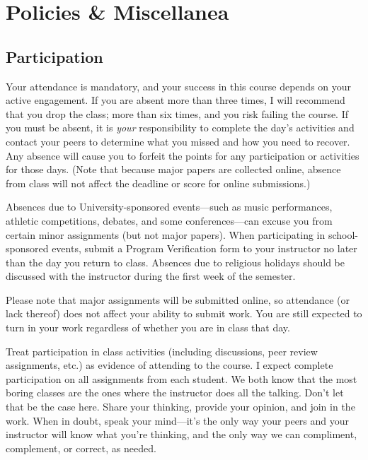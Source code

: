 \documentclass[11pt, twosides]{amsart}	%
\begin{document}
  

\section{Policies \& Miscellanea}

\subsection{Participation}
Your attendance is mandatory, and your success in this course depends on your active engagement.  If you are absent more than three times, I will recommend that you drop the class; more than six times, and you risk failing the course.  If you must be absent, it is \emph{your} responsibility to complete the day’s activities and contact your peers to determine what you missed and how you need to recover. Any absence will cause you to forfeit the points for any participation or activities for those days. (Note that because major papers are collected online, absence from class will not affect the deadline or score for online submissions.)

Absences due to University-sponsored events—such as music performances, athletic competitions, debates, and some conferences—can excuse you from certain minor assignments (but not major papers). When participating in school-sponsored events, submit a Program Verification form to your instructor no later than the day you return to class. Absences due to religious holidays should be discussed with the instructor during the first week of the semester.

Please note that major assignments will be submitted online, so attendance (or lack thereof) does not affect your ability to submit work. You are still expected to turn in your work regardless of whether you are in class that day.

Treat participation in class activities (including discussions, peer review assignments, etc.) as evidence of attending to the course. I expect complete participation on all assignments from each student. We both know that the most boring classes are the ones where the instructor does all the talking. Don't let that be the case here. Share your thinking, provide your opinion, and join in the work. When in doubt, speak your mind—it's the only way your peers and your instructor will know what you're thinking, and the only way we can compliment, complement, or correct, as needed.
\end{document}
